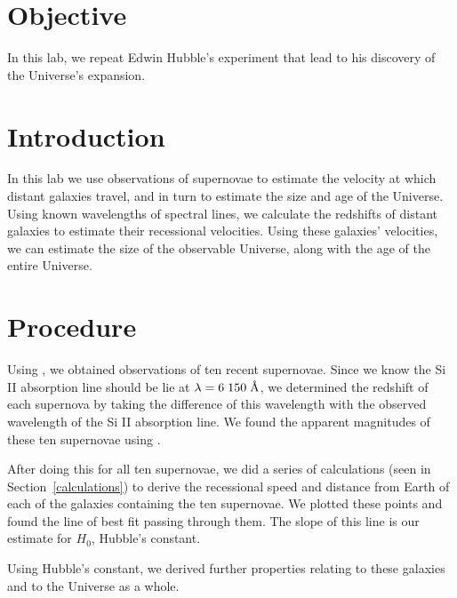 \documentclass[11pt]{article}
\begin{document}
\section{Objective}
In this lab, we repeat Edwin Hubble's experiment that lead to his discovery of the Universe's expansion.


\section{Introduction}
In this lab we use observations of supernovae to estimate the velocity at which distant galaxies travel, and in turn to estimate the size and age of the Universe.
Using known wavelengths of spectral lines, we calculate the redshifts of distant galaxies to estimate their recessional velocities.
Using these galaxies' velocities, we can estimate the size of the observable Universe, along with the age of the entire Universe.



\section{Procedure}
Using \cite{WISeREP}, we obtained observations of ten recent supernovae.
Since we know the Si II absorption line should be lie at $\lambda = 6\;150\;\textrm{\r{A}}$, we determined the redshift of each supernova by taking the difference of this wavelength with the observed wavelength of the Si II absorption line.
We found the apparent magnitudes of these ten supernovae using \cite{supernovacatalog}.

After doing this for all ten supernovae, we did a series of calculations (seen in Section~\ref{calculations}) to derive the recessional speed and distance from Earth of each of the galaxies containing the ten supernovae.
We plotted these points and found the line of best fit passing through them.
The slope of this line is our estimate for $H_0$, Hubble's constant.

Using Hubble's constant, we derived further properties relating to these galaxies and to the Universe as a whole.
\end{document}
